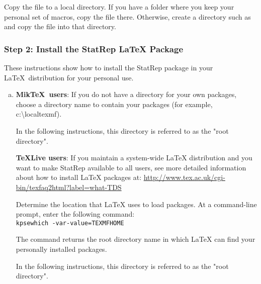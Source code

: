 \documentclass[article,oneside]{memoir}
\begin{document}
   Copy the file  to a local directory. If you have a
   folder where you keep your personal set of macros, copy the file
   there. Otherwise, create a directory such as 
    and copy the file into that directory.

\subsubsection{Step 2: Install the StatRep LaTeX Package}

   These instructions show how to install the StatRep package
   in your \LaTeX\ distribution for your personal use.
   
  \begin{enumerate}[a)]
   \item
   \textbf{Mik\TeX\ users}: If you do not have a directory for your own 
   packages, choose a directory name to contain your packages 
   (for example, c:\textbackslash{}localtexmf).
     
   In the following instructions, this directory is referred to as the
   "root directory".
   
   \textbf{\TeX{}Live users}:
   If you maintain a system-wide LaTeX distribution and you want to 
      make StatRep available to all users, see more detailed information 
      about how to install LaTeX packages at:
      \url{http://www.tex.ac.uk/cgi-bin/texfaq2html?label=what-TDS}
   
   Determine the location that LaTeX uses to load packages. At a
   command-line prompt, enter the following command:\\
   \texttt{kpsewhich -var-value=TEXMFHOME}

   The command returns the root directory name in which LaTeX can
   find your personally installed packages.

    In the following instructions, this directory is referred to as the
    "root directory".


\end{enumerate}
\end{document}

